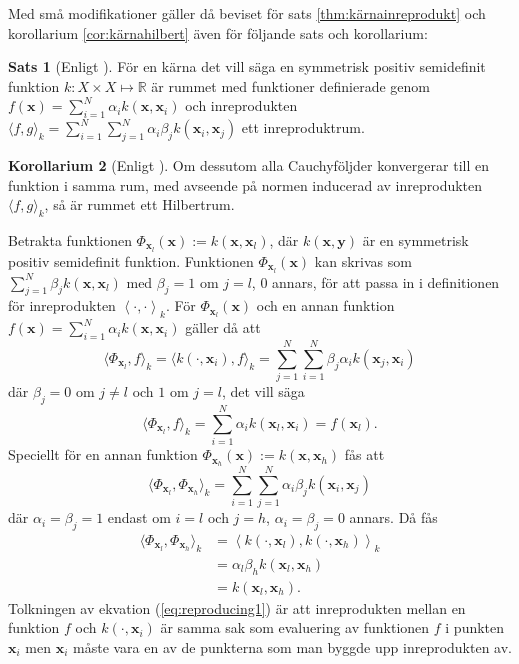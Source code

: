 \documentclass[a4paper, 12pt]{report}
\theoremstyle{definition}
\newtheorem{thm}{Sats}[section]
\newtheorem{cor}[thm]{Korollarium}
\theoremstyle{remark}
\newcommand{\bfx}{\mathbf{x}}
\newcommand{\bfy}{\mathbf{y}}
\newcommand{\llangle}{\left\langle}
\newcommand{\rrangle}{\right\rangle}
\newcommand{\inner}[2]{\llangle #1, #2 \rrangle}
\begin{document}
Med små modifikationer gäller då beviset för sats \ref{thm:kärnainreprodukt} och korollarium \ref{cor:kärnahilbert} även för följande sats och korollarium:
\begin{thm}[Enligt \cite{LearningKernels}]
	För en kärna det vill säga en symmetrisk positiv semidefinit funktion $k: X \times X \longmapsto \mathbb{R}$ är rummet med funktioner definierade genom $f\left(\bfx\right) = \sum_{i=1}^{N}\alpha_ik\left(\bfx, \bfx_i\right)$ och inreprodukten $\langle f,g\rangle_k = \sum_{i=1}^{N}\sum_{j=1}^{N} \alpha_i\beta_jk\left(\bfx_i, \bfx_j\right)$ ett inreproduktrum.
\end{thm}
\begin{cor}[Enligt \cite{LearningKernels}]
	Om dessutom alla Cauchyföljder konvergerar till en funktion i samma rum, med avseende på normen inducerad av inreprodukten $\langle f, g\rangle_k$, så är rummet ett Hilbertrum.
\end{cor}
Betrakta funktionen $\Phi_{\bfx_l}(\bfx):=k\left(\bfx, \bfx_l\right)$,  där $k\left(\bfx, \bfy\right)$ är en symmetrisk positiv semidefinit funktion.  Funktionen $\Phi_{\bfx_l}(\bfx)$ kan skrivas som $\sum_{j=1}^{N}\beta_jk\left(\bfx, \bfx_l\right)$ med $\beta_j=1$ om $j=l$, 0 annars, för att passa in i definitionen för inreprodukten $\inner{\cdot}{\cdot}_k$. För $\Phi_{\bfx_l}(\bfx)$ och en annan funktion $f\left(\bfx\right) = \sum_{i=1}^{N}\alpha_ik\left(\bfx, \bfx_i\right)$ gäller då att
	\begin{equation*}
		\langle \Phi_{\bfx_l}, f\rangle_k = \langle k\left(\cdot, \bfx_i\right), f\rangle_k = \sum_{j=1}^{N}\sum_{i=1}^{N}\beta_j\alpha_i k\left(\bfx_j, \bfx_i\right)
	\end{equation*}
	där $\beta_j = 0$ om $j\neq l$ och $1$ om $j=l$, det vill säga
	\begin{equation}\label{eq:reproducing1}
		\langle \Phi_{\bfx_l}, f\rangle_k = \sum_{i=1}^{N}\alpha_i k\left(\bfx_l, \bfx_i\right) = f\left(\bfx_l\right).
	\end{equation}
	Speciellt för en annan funktion $\Phi_{\bfx_h}(\bfx):=k\left(\bfx, \bfx_h\right)$ fås att
	\begin{equation*}
		\langle \Phi_{\bfx_l}, \Phi_{\bfx_h} \rangle_k = \sum_{i=1}^{N}\sum_{j=1}^{N}\alpha_i\beta_jk\left(\bfx_i, \bfx_j\right)
	\end{equation*}
	där $\alpha_i=\beta_j=1$ endast om $i=l$ och $j=h$, $\alpha_i=\beta_j=0$ annars. Då fås
	\begin{equation}\label{eq:reproducing2}
	\begin{aligned}
	\langle \Phi_{\bfx_l}, \Phi_{\bfx_h} \rangle_k &= \inner{k\left(\cdot, \bfx_l\right)}{k\left(\cdot, \bfx_h\right)}_k\\ &= \alpha_l\beta_hk\left(\bfx_l, \bfx_h\right)\\&= k\left(\bfx_l, \bfx_h\right).
	\end{aligned}
	\end{equation}
Tolkningen av ekvation (\ref{eq:reproducing1}) är att inreprodukten mellan en funktion $f$ och $k\left(\cdot, \bfx_i\right)$ är samma sak som evaluering av funktionen $f$ i punkten $\bfx_i$ men $\bfx_i$ måste vara en av de punkterna som man byggde upp inreprodukten av.
\end{document}
